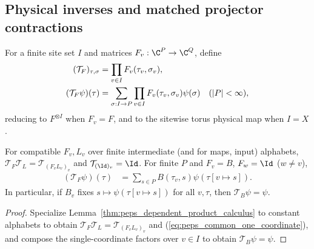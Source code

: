 \subsection{Physical inverses and matched projector contractions}
\label{sec:peps_four_cut_common_projectors}

\begin{definition}%
    \label{def:peps_four_cut_common_physical_product}
    \leanok
    For a finite site set $I$ and matrices $F_v:\C^P\to\C^Q$, define
    \begin{align}
        (\mathcal T_F)_{\tau,\sigma} & =\prod_{v\in I}F_v(\tau_v,\sigma_v),
        \notag                                                                                                               \\
        (\mathcal T_F\psi)(\tau)
                                     & =\sum_{\sigma:I\to P}\prod_{v\in I}F_v(\tau_v,\sigma_v)\psi(\sigma)\quad(|P|<\infty),
        \label{eq:peps_common_physical_product}
    \end{align}
    reducing to $F^{\otimes I}$ when $F_v=F$, and to the sitewise torus
    physical map when $I=X$.
\end{definition}

\begin{lemma}%
    \label{thm:peps_four_cut_common_product_algebra}
    \leanok
    For compatible $F_v,L_v$ over finite intermediate (and for maps, input)
    alphabets, $\mathcal T_F\mathcal T_L=\mathcal T_{(F_vL_v)_v}$ and
    $\mathcal T_{(\Id)_v}=\Id$. For finite $P$ and $F_v=B$, $F_w=\Id$ ($w\ne v$),
    \begin{align}
        (\mathcal T_F\psi)(\tau)
         & =\sum_{s\in P}B(\tau_v,s)\psi(\tau[v\mapsto s]).
        \label{eq:peps_common_one_coordinate}
    \end{align}
    In particular, if $B_v$ fixes $s\mapsto\psi(\tau[v\mapsto s])$ for all $v,\tau$,
    then $\mathcal T_B\psi=\psi$.
\end{lemma}
\begin{proof}\leanok
    Specialize Lemma~\ref{thm:peps_dependent_product_calculus} to constant
    alphabets to obtain $\mathcal T_F\mathcal T_L=\mathcal T_{(F_vL_v)_v}$ and
    (\ref{eq:peps_common_one_coordinate}), and compose the single-coordinate
    factors over $v\in I$ to obtain $\mathcal T_B\psi=\psi$.
\end{proof}

